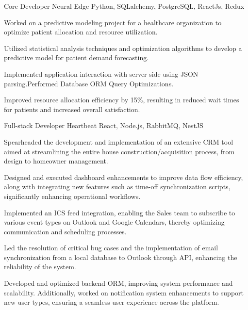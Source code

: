 

\begin{cventries}



  \cventry
  {Core Developer} %
  {Neural Edge } %
  {Python, SQLalchemy, PostgreSQL, ReactJs, Redux} %
  {} %
  {
    \begin{cvitems} %
      \item {Worked on a predictive modeling project for a healthcare organization to optimize patient allocation and resource utilization.}
      \item {Utilized statistical analysis techniques and optimization algorithms to develop a predictive model for patient demand forecasting.}
      \item {Implemented application interaction with server side using JSON parsing.Performed Database ORM Query Optimizations.}
      \item { Improved resource allocation efficiency by 15\%, resulting in reduced wait times for patients and increased overall satisfaction.}
    \end{cvitems}
  }

   
  \cventry
  {Full-stack Developer} %
  {Heartbeat} %
  {React, Node.js, RabbitMQ, NestJS} %
  {} %
  {
  \begin{cvitems} %
    \item {Spearheaded the development and implementation of an extensive CRM tool aimed at streamlining the entire house construction/acquisition process, from design to homeowner management.}
    \item {Designed and executed dashboard enhancements to improve data flow efficiency, along with integrating new features such as time-off synchronization scripts, significantly enhancing operational workflows.}
    \item {Implemented an ICS feed integration, enabling the Sales team to subscribe to various event types on Outlook and Google Calendars, thereby optimizing communication and scheduling processes.}
    \item {Led the resolution of critical bug cases and the implementation of email synchronization from a local database to Outlook through API, enhancing the reliability of the system.}
    \item {Developed and optimized backend ORM, improving system performance and scalability. Additionally, worked on notification system enhancements to support new user types, ensuring a seamless user experience across the platform.}
  \end{cvitems}
}


\end{cventries}
